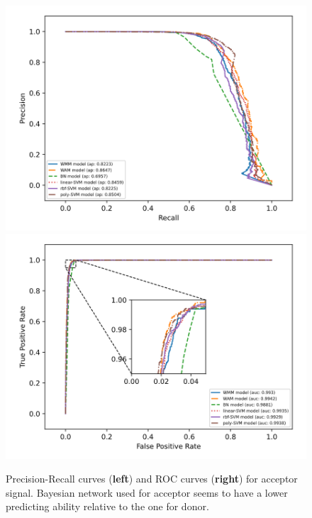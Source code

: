 \documentclass[journal,twoside]{IEEEtran}
\begin{document}
\begin{figure}[htbp]
\centerline{\includegraphics[scale=0.28]{Pics/all_prcurve_acceptor.png}
    \includegraphics[scale=0.28]{Pics/all_roccurve_acceptor.png}}
\caption{Precision-Recall curves (\textbf{left}) and ROC curves (\textbf{right}) for acceptor signal. Bayesian network used for acceptor seems to have a lower predicting ability relative to the one for donor. }
\label{fig7}
\end{figure}
\end{document}
